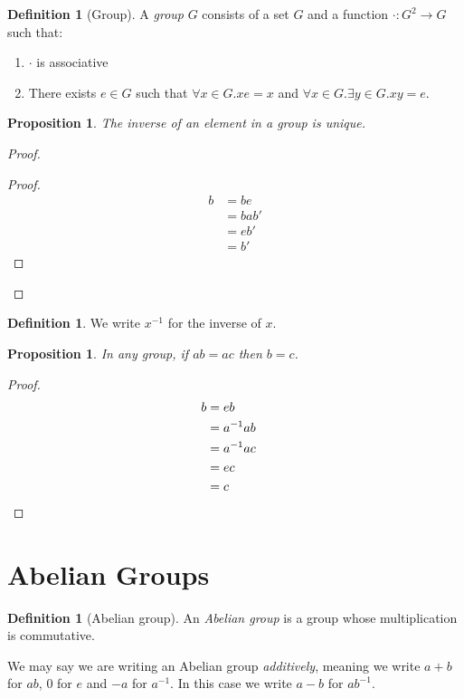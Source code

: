 \documentclass{book}
\let\qed\relax
\newtheorem{prop}[ax]{Proposition}
\theoremstyle{definition}
\newtheorem{df}[ax]{Definition}
\begin{document}
\begin{df}[Group]
A \emph{group} $G$ consists of a set $G$ and a function $\cdot : G^2 \rightarrow G$ such that:
\begin{enumerate}
\item $\cdot$ is associative
\item There exists $e \in G$ such that $\forall x \in G. xe = x$ and $\forall x \in G. \exists y \in G. xy = e$.
\end{enumerate}
\end{df}

\begin{prop}
The inverse of an element in a group is unique.
\end{prop}

\begin{proof}
\pf
{}
\begin{proof}
	\pf
	\begin{align*}
		b & = be \\
		& = bab' \\
		& = eb' \\
		& = b'
	\end{align*}
\end{proof}
\qed
\end{proof}

\begin{df}
We write $x^{-1}$ for the inverse of $x$.
\end{df}

\begin{prop}
\label{prop:groupcancel}
In any group, if $ab = ac$ then $b = c$.
\end{prop}

\begin{proof}
\pf
\begin{align*}
b & = eb \\
& = a^{-1}ab \\
& = a^{-1}ac \\
& = ec \\
& = c & \qed
\end{align*}
\end{proof}

\section{Abelian Groups}

\begin{df}[Abelian group]
An \emph{Abelian group} is a group whose multiplication is commutative.

We may say we are writing an Abelian group \emph{additively}, meaning we write $a + b$ for $ab$, $0$ for $e$ and $-a$ for $a^{-1}$. In this case we write $a-b$ for $ab^{-1}$.
\end{df}
\end{document}

